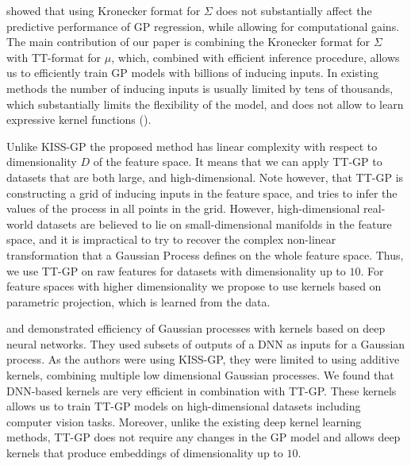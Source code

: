 \citet{nickson2015} showed that using Kronecker
format for $\Sigma$ does not substantially affect the predictive performance
of GP regression, while allowing for computational gains. The main contribution
of our paper is combining the Kronecker format for $\Sigma$ with TT-format
for $\mu$, which, combined with efficient inference procedure, allows us to
efficiently train GP models with billions of inducing inputs. In existing
methods the number of inducing inputs is usually limited by tens of thousands,
which substantially limits the flexibility of the model, and does not allow
to learn expressive kernel functions (\citet{wilson2014}). 

Unlike KISS-GP the proposed method has linear complexity with respect to 
dimensionality $D$ of the feature space. It means that we can apply TT-GP
to datasets that are both large, and high-dimensional. Note however, that
TT-GP is constructing a grid of inducing inputs in the feature space, and
tries to infer the values of the process in all points in the grid. However,
high-dimensional real-world datasets are believed to lie on small-dimensional
manifolds in the feature space, and it is impractical to try to recover the
complex non-linear transformation that a Gaussian Process defines on the 
whole feature space. Thus, we use TT-GP on raw features for datasets with
dimensionality up to $10$. For feature spaces with higher dimensionality
we propose to use kernels based on parametric projection, which is learned
from the data.
 
\citet{wilson2016deep} and \citet{wilson2016stochastic}
demonstrated efficiency of Gaussian processes with kernels based on deep
neural networks. They used subsets of outputs of a DNN as
inputs for a Gaussian process. As the authors were using KISS-GP, they
were limited to using additive kernels, combining multiple low dimensional 
Gaussian processes. We found that DNN-based kernels are very efficient 
in combination with TT-GP. These kernels allows us to train TT-GP models
on high-dimensional datasets including computer vision tasks. Moreover,
unlike the existing deep kernel learning methods, TT-GP does not require
any changes in the GP model and allows deep kernels that produce embeddings
of dimensionality up to $10$.
